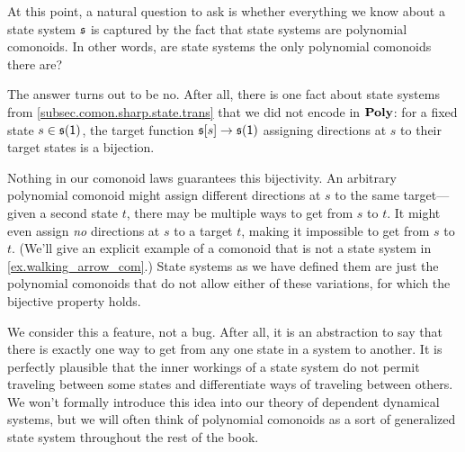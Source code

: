 \documentclass[Book-Poly]{subfiles}
\begin{document}
\begin{example} \label{ex.not_all_com_state}
At this point, a natural question to ask is whether everything we know about a state system $\mathfrak{s}$ is captured by the fact that state systems are polynomial comonoids.
In other words, are state systems the only polynomial comonoids there are?

The answer turns out to be no.
After all, there is one fact about state systems from \cref{subsec.comon.sharp.state.trans} that we did not encode in $\mathbf{Poly}$: for a fixed state $s\in\mathfrak{s}(\textsf{1})$, the target function $\mathfrak{s}[s]\to\mathfrak{s}(\textsf{1})$ assigning directions at $s$ to their target states is a bijection.

Nothing in our comonoid laws guarantees this bijectivity.
An arbitrary polynomial comonoid might assign different directions at $s$ to the same target---given a second state $t$, there may be multiple ways to get from $s$ to $t$.
It might even assign \emph{no} directions at $s$ to a target $t$, making it impossible to get from $s$ to $t$.
(We'll give an explicit example of a comonoid that is not a state system in \cref{ex.walking_arrow_com}.)
State systems as we have defined them are just the polynomial comonoids that do not allow either of these variations, for which the bijective property holds.

We consider this a feature, not a bug.
After all, it is an abstraction to say that there is exactly one way to get from any one state in a system to another.
It is perfectly plausible that the inner workings of a state system do not permit traveling between some states and differentiate ways of traveling between others.
We won't formally introduce this idea into our theory of dependent dynamical systems, %
but we will often think of polynomial comonoids as a sort of generalized state system throughout the rest of the book.
\end{example}
\end{document}

